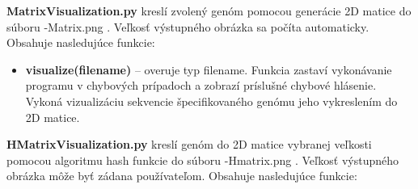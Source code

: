 \textbf{\selectfont MatrixVisualization.py} kreslí zvolený genóm pomocou generácie 2D matice do súboru {\selectfont -Matrix.png} .
Veľkosť výstupného obrázka sa počíta automaticky.
Obsahuje nasledujúce funkcie:
\begin{itemize}
  \item \textbf{\selectfont visualize(filename)} -- overuje typ {\selectfont filename}. Funkcia zastaví vykonávanie programu v chybových prípadoch a zobrazí príslušné chybové hlásenie. Vykoná vizualizáciu sekvencie špecifikovaného genómu jeho vykreslením do 2D matice.
\end{itemize}



\textbf{\selectfont HMatrixVisualization.py} kreslí genóm do 2D matice vybranej veľkosti pomocou algoritmu hash funkcie do súboru {\selectfont -Hmatrix.png} .
Veľkosť výstupného obrázka môže byť zádana používateľom.
Obsahuje nasledujúce funkcie:
